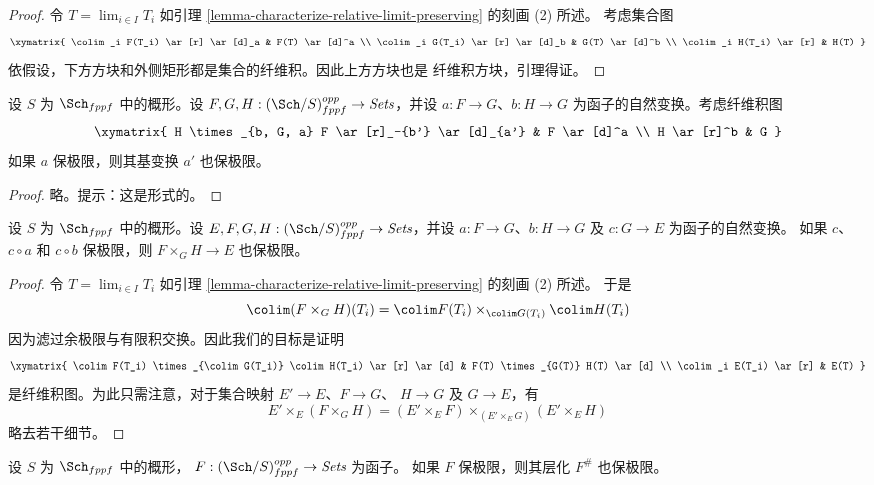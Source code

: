 \begin{proof}
令 $T = \lim_{i \in I}T_i$ 如引理
\ref{lemma-characterize-relative-limit-preserving} 的刻画 (2) 所述。
考虑集合图
$$
\xymatrix{
\colim_i F(T_i) \ar[r] \ar[d]_a & F(T) \ar[d]^a \\
\colim_i G(T_i) \ar[r] \ar[d]_b & G(T) \ar[d]^b \\
\colim_i H(T_i) \ar[r] & H(T)
}
$$
依假设，下方方块和外侧矩形都是集合的纤维积。因此上方方块也是
纤维积方块，引理得证。
\end{proof}

\begin{lemma}
\label{lemma-base-change-locally-finite-presentation}
设 $S$ 为 $\Sch_{fppf}$ 中的概形。设
$F, G, H : (\Sch/S)_{fppf}^{opp} \to \textit{Sets}$，并设
$a : F \to G$、$b : H \to G$ 为函子的自然变换。考虑纤维积图
$$
\xymatrix{
H \times_{b, G, a} F \ar[r]_-{b'} \ar[d]_{a'} & F \ar[d]^a \\
H \ar[r]^b & G
}
$$
如果 $a$ 保极限，则其基变换 $a'$ 也保极限。
\end{lemma}

\begin{proof}
略。提示：这是形式的。
\end{proof}

\begin{lemma}
\label{lemma-fibre-product-locally-finite-presentation}
设 $S$ 为 $\Sch_{fppf}$ 中的概形。设
$E, F, G, H : (\Sch/S)_{fppf}^{opp} \to \textit{Sets}$，并设
$a : F \to G$、$b : H \to G$ 及 $c : G \to E$ 为函子的自然变换。
如果 $c$、$c \circ a$ 和 $c \circ b$ 保极限，则
$F \times_G H \to E$ 也保极限。
\end{lemma}

\begin{proof}
令 $T = \lim_{i \in I}T_i$ 如引理
\ref{lemma-characterize-relative-limit-preserving} 的刻画 (2) 所述。
于是
$$
\colim (F \times_G H)(T_i) =
\colim F(T_i) \times_{\colim G(T_i)} \colim H(T_i)
$$
因为滤过余极限与有限积交换。因此我们的目标是证明
$$
\xymatrix{
\colim F(T_i) \times_{\colim G(T_i)} \colim H(T_i) \ar[r] \ar[d] &
F(T) \times_{G(T)} H(T) \ar[d] \\
\colim_i E(T_i) \ar[r] & E(T)
}
$$
是纤维积图。为此只需注意，对于集合映射 $E' \to E$、$F \to G$、
$H \to G$ 及 $G \to E$，有
$$
E' \times_E (F \times_G H) =
(E' \times_E F) \times_{(E' \times_E G)} (E' \times_E H)
$$
略去若干细节。
\end{proof}

\begin{lemma}
\label{lemma-sheafify-finite-presentation}
设 $S$ 为 $\Sch_{fppf}$ 中的概形，
$F : (\Sch/S)_{fppf}^{opp} \to \textit{Sets}$ 为函子。
如果 $F$ 保极限，则其层化 $F^\#$ 也保极限。
\end{lemma}

